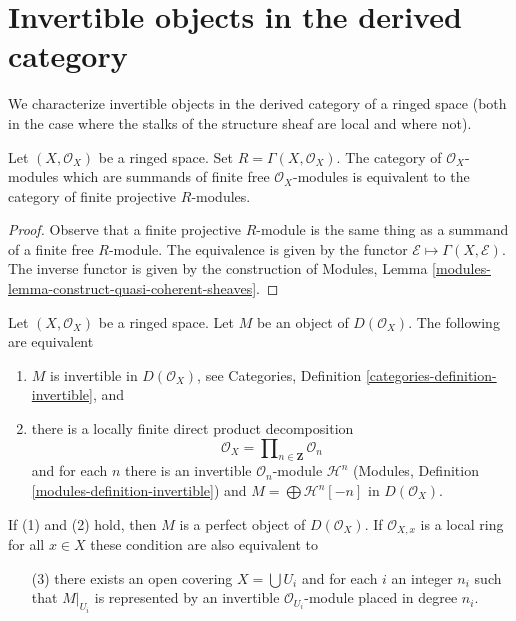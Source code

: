 \section{Invertible objects in the derived category}
\label{section-invertible-D-or-R}

\noindent
We characterize invertible objects in the derived category of
a ringed space (both in the case where the stalks of the
structure sheaf are local and where not).

\begin{lemma}
\label{lemma-category-summands-finite-free}
Let $(X, \mathcal{O}_X)$ be a ringed space.
Set $R = \Gamma(X, \mathcal{O}_X)$. The category of
$\mathcal{O}_X$-modules which are summands of finite free
$\mathcal{O}_X$-modules is equivalent to the category of
finite projective $R$-modules.
\end{lemma}

\begin{proof}
Observe that a finite projective $R$-module is the same thing
as a summand of a finite free $R$-module.
The equivalence is given by the functor $\mathcal{E} \mapsto
\Gamma(X, \mathcal{E})$. The inverse functor is given by the construction of
Modules, Lemma \ref{modules-lemma-construct-quasi-coherent-sheaves}.
\end{proof}

\begin{lemma}
\label{lemma-invertible-derived}
Let $(X, \mathcal{O}_X)$ be a ringed space. Let $M$ be an object
of $D(\mathcal{O}_X)$. The following are equivalent
\begin{enumerate}
\item $M$ is invertible in $D(\mathcal{O}_X)$, see
Categories, Definition \ref{categories-definition-invertible}, and
\item there is a locally finite direct product decomposition
$$
\mathcal{O}_X = \prod\nolimits_{n \in \mathbf{Z}} \mathcal{O}_n
$$
and for each $n$ there is an invertible $\mathcal{O}_n$-module
$\mathcal{H}^n$ (Modules, Definition \ref{modules-definition-invertible})
and $M = \bigoplus \mathcal{H}^n[-n]$ in $D(\mathcal{O}_X)$.
\end{enumerate}
If (1) and (2) hold, then $M$ is a perfect object of $D(\mathcal{O}_X)$. If
$\mathcal{O}_{X, x}$ is a local ring for all $x \in X$ these condition
are also equivalent to
\begin{enumerate}
\item[(3)] there exists an open covering $X = \bigcup U_i$
and for each $i$ an integer $n_i$ such that $M|_{U_i}$
is represented by an invertible $\mathcal{O}_{U_i}$-module
placed in degree $n_i$.
\end{enumerate}
\end{lemma}

